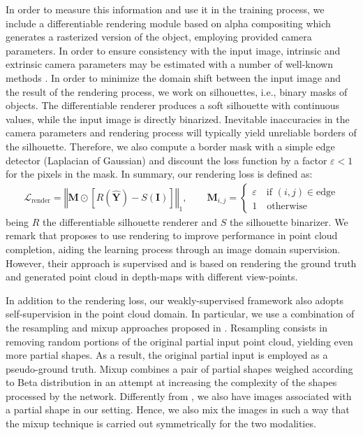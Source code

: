 \documentclass{article}
\newcommand{\Mb}{\mathbf{M}}
\newcommand{\Yb}{\mathbf{Y}}
\newcommand{\Ib}{\mathbf{I}}
\begin{document}
In order to measure this information and use it in the training process, we include a differentiable rendering module based on alpha compositing \cite{wiles2020synsin} which generates a rasterized version of the object, employing provided camera parameters. In order to ensure consistency with the input image, intrinsic and extrinsic camera parameters may be estimated with a number of well-known methods \cite{insafutdinov18pointclouds} \cite{grabner2020geometric} \cite{palazzi2018end}. In order to minimize the domain shift between the input image and the result of the rendering process, we work on silhouettes, i.e., binary masks of objects. The differentiable renderer produces a soft silhouette with continuous values, while the input image is directly binarized. Inevitable inaccuracies in the camera parameters and rendering process will typically yield unreliable borders of the silhouette. Therefore, we also compute a border mask with a simple edge detector (Laplacian of Gaussian) and discount the loss function by a factor $\varepsilon <1$ for the pixels in the mask. In summary, our rendering loss is defined as:
\begin{align}
    \mathcal{L}_\text{render} = \left\Vert \Mb \odot \left[ R(\hat{\Yb}) - S(\Ib) \right] \right\Vert_1, \qquad \Mb_{i,j} = \begin{cases}\varepsilon \quad \text{if } (i,j) \in \text{edge}\\ 1 \quad \text{otherwise}\end{cases}
\end{align}
being $R$ the differentiable silhouette renderer and $S$ the silhouette binarizer. 
We remark that \cite{xie2021style} proposes to use rendering to improve performance in point cloud completion, aiding the learning process through an image domain supervision. However, their approach is supervised and is based on rendering the ground truth and generated point cloud in depth-maps with different view-points.

In addition to the rendering loss, our weakly-supervised framework also adopts self-supervision in the point cloud domain. In particular, we use a combination of the resampling and mixup approaches proposed in \cite{selfsup,crn}. Resampling consists in removing random portions of the original partial input point cloud, yielding even more partial shapes. As a result, the original partial input is employed as a pseudo-ground truth. Mixup combines a pair of partial shapes weighed according to Beta distribution in an attempt at increasing the complexity of the shapes processed by the network. Differently from \cite{crn}, we also have images associated with a partial shape in our setting. Hence, we also mix the images in such a way that the mixup technique is carried out symmetrically for the two modalities.
\end{document}
